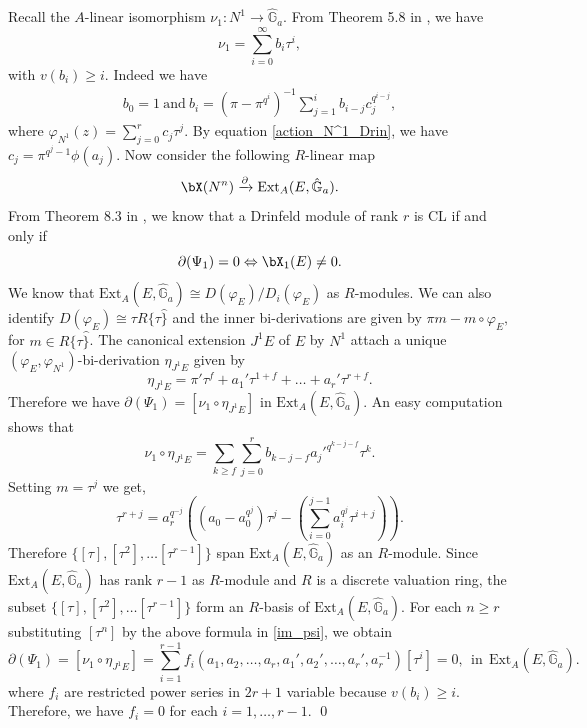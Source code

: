 \documentclass{amsart}
\numberwithin {equation}{section}
\begin{document}
\proof Recall the $A$-linear isomorphism $\nu_{1}:N^{1}\longrightarrow\hat{\mathbb{G}}_{a}$. From Theorem 5.8 in \cite{BS b}, we have 
$$\nu_{1}=\displaystyle{\sum_{i=0}^{\infty}}b_{i}\tau^{i},$$
with $v(b_{i})\geq i$. Indeed we have
\begin{align*}
b_{0}=1 \
\mathrm{and}  \ b_{i}=(\pi-\pi^{q^{i}})^{-1}\displaystyle{\sum_{j=1}^{i}}b_{i-j}c_{j}^{q^{i-j}},
\end{align*} 
where $\varphi_{N^{1}}(z)=\displaystyle{\sum_{j=0}^{r}}c_{j}\tau^{j}$. By equation \eqref{action_N^1_Drin}, we have $c_{j}=\pi^{q^{j}-1}\phi(a_{j})$.
Now consider the following $R$-linear map
 $$ {\bX}(N^{n})\xrightarrow{\partial} \mathrm{Ext}_{A}(E,\hat{\mathbb{G}}_{a}) .$$
From Theorem 8.3 in \cite{BS b}, we know that a Drinfeld module of rank $r$ is CL if and only if
 $$\partial(\Psi_{1})=0 \Leftrightarrow {\bX}_{1}(E)\neq 0 .$$ We know that $\mathrm{Ext}_{A}(E,\hat{\mathbb{G}}_{a})\cong D(\varphi_{E})/D_{i}(\varphi_{E})$ as $R$-modules. We can also identify $D(\varphi_{E})\cong \tau R\{\tau\hat{\}}$ and the inner bi-derivations are given by
$\pi m-m\circ \varphi_{E},$ for $m\in R\{\tau\hat{\}}$. The canonical extension  $J^{1}E$ of $E$ by $N^{1}$ attach a unique $(\varphi_{E},\varphi_{N^{1}})$-bi-derivation $\eta_{J^{1}E}$ given by 
\begin{equation*}
\eta_{J^{1}E}=\pi' \tau^{f} + a_{1}'{\tau}^{1+f}+\ldots+ a_{r}'{\tau}^{r+f}.
\end{equation*}
Therefore we have $\partial(\Psi_{1})=[\nu_{1}\circ \eta_{J^{1}E}]$ in $\mathrm{Ext}_{A}(E,\hat{\mathbb{G}}_{a})$. An easy computation shows that 
\begin{equation}\label{im_psi}
\nu_{1}\circ \eta_{J^{1}E}=\displaystyle{\sum_{k\geq f}\sum_{j=0}^{r}}b_{k-j-f}a_{j}'^{q^{k-j-f}}\tau^{k}.
\end{equation}
Setting $m=\tau^{j}$ we get,
$$\tau^{r+j}= a_{r}^{q^{-j}}((a_{0}-a_{0}^{q^{j}})\tau^{j}-(\displaystyle{\sum_{i=0}^{j-1}}a_{i}^{q^{j}}\tau^{i+j})).$$
 Therefore $\{[\tau],[\tau^{2}],\ldots [\tau^{r-1}] \}$ span $ \mathrm{Ext}_{A}(E,\hat{\mathbb{G}}_{a})$ as an $R$-module. Since $ \mathrm{Ext}_{A}(E,\hat{\mathbb{G}}_{a})$ has rank $r-1$ as $R$-module and $R$ is a discrete valuation ring, the subset $\{[\tau],[\tau^{2}],\ldots [\tau^{r-1}] \}$ form an $R$-basis of $\mathrm{Ext}_{A}(E,\hat{\mathbb{G}}_{a})$.
 For each $n\geq r$  substituting $[\tau^{n}]$ by the above formula in \eqref{im_psi}, we obtain 
$$ \partial(\Psi_{1})=[\nu_{1}\circ \eta_{J^{1}E}]=\displaystyle{\sum_{i=1}^{r-1}} f_{i}(a_{1},a_{2},\ldots ,a_{r},a_{1}',a_{2}',\ldots ,a_{r}',a_{r}^{-1})[\tau^{i}]=0, \ ~\mathrm{in}~ \ \mathrm{Ext}_{A}(E,\hat{\mathbb{G}}_{a}).$$
where $f_{i}$ are restricted power series in $2r+1$  variable because $v(b_{i})\geq i$. Therefore, we have $f_{i}=0$ for each $i=1,\ldots,r-1$. \qed \medskip
\end{document}
